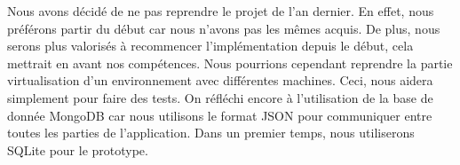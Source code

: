 Nous avons décidé de ne pas reprendre le projet de l'an dernier. En effet, nous préférons partir du début car nous n'avons pas les mêmes acquis. De plus, nous serons plus valorisés à recommencer l'implémentation depuis le début, cela mettrait en avant nos compétences. Nous pourrions cependant reprendre la partie virtualisation d'un environnement avec différentes machines. Ceci, nous aidera simplement pour faire des tests. On réfléchi encore à l'utilisation de la base de donnée MongoDB car nous utilisons le format JSON pour communiquer entre toutes les parties de l'application. Dans un premier temps, nous utiliserons SQLite pour le prototype.
